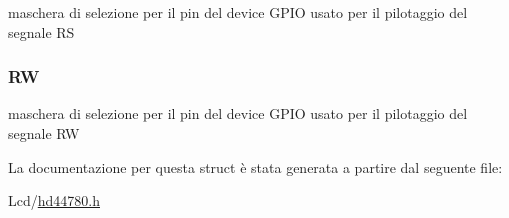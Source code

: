 maschera di selezione per il pin del device G\+P\+I\+O usato per il pilotaggio del segnale R\+S \hypertarget{struct_h_d44780___l_c_d__t_af8225e4a125a2159215dfa03372c305f}{
\subsubsection[{R\+W}]{ R\+W}}\label{struct_h_d44780___l_c_d__t_af8225e4a125a2159215dfa03372c305f}
maschera di selezione per il pin del device G\+P\+I\+O usato per il pilotaggio del segnale R\+W 

La documentazione per questa struct è stata generata a partire dal seguente file\+:\begin{DoxyCompactItemize}
\item 
Lcd/\hyperlink{hd44780_8h}{hd44780.\+h}\end{DoxyCompactItemize}
